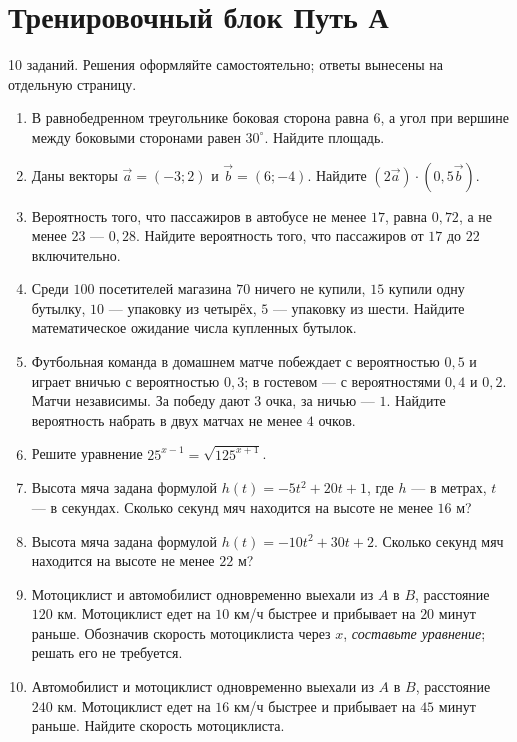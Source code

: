 \documentclass[a4paper,12pt]{article}
\begin{document}
\section*{Тренировочный блок \quad \color{accent}\large Путь А}
\textcolor{muted}{10 заданий. Решения оформляйте самостоятельно; ответы вынесены на отдельную страницу.}
\begin{enumerate}[label=\textbf{\arabic*.}]
\item В равнобедренном треугольнике боковая сторона равна $6$, а угол при вершине между боковыми сторонами равен $30^\circ$. Найдите площадь.
\item Даны векторы $\vec a=(-3;2)$ и $\vec b=(6;-4)$. Найдите $(2\vec a)\cdot(0{,}5\vec b)$.
\item Вероятность того, что пассажиров в автобусе не менее $17$, равна $0{,}72$, а не менее $23$ --- $0{,}28$. Найдите вероятность того, что пассажиров от $17$ до $22$ включительно.
\item Среди $100$ посетителей магазина $70$ ничего не купили, $15$ купили одну бутылку, $10$ --- упаковку из четырёх, $5$ --- упаковку из шести. Найдите математическое ожидание числа купленных бутылок.
\item Футбольная команда в домашнем матче побеждает с вероятностью $0{,}5$ и играет вничью с вероятностью $0{,}3$; в гостевом --- с вероятностями $0{,}4$ и $0{,}2$. Матчи независимы. За победу дают $3$ очка, за ничью --- $1$. Найдите вероятность набрать в двух матчах не менее $4$ очков.
\item Решите уравнение $25^{x-1}=\sqrt{125^{x+1}}$.
\item Высота мяча задана формулой $h(t)=-5t^2+20t+1$, где $h$ --- в метрах, $t$ --- в секундах. Сколько секунд мяч находится на высоте не менее $16$ м?
\item Высота мяча задана формулой $h(t)=-10t^2+30t+2$. Сколько секунд мяч находится на высоте не менее $22$ м?
\item Мотоциклист и автомобилист одновременно выехали из $A$ в $B$, расстояние $120$ км. Мотоциклист едет на $10$ км/ч быстрее и прибывает на $20$ минут раньше. Обозначив скорость мотоциклиста через $x$, \emph{составьте уравнение}; решать его не требуется.
\item Автомобилист и мотоциклист одновременно выехали из $A$ в $B$, расстояние $240$ км. Мотоциклист едет на $16$ км/ч быстрее и прибывает на $45$ минут раньше. Найдите скорость мотоциклиста.
\end{enumerate}

\clearpage
\end{document}
